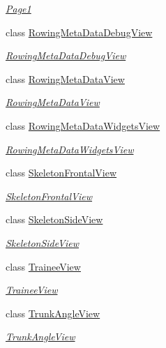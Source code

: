 \begin{DoxyCompactItemize}
\begin{DoxyCompactList}\small\item\em \hyperlink{class_rowing_monitor_1_1_view_1_1_page1}{Page1} \end{DoxyCompactList}\item 
class \hyperlink{class_rowing_monitor_1_1_view_1_1_rowing_meta_data_debug_view}{Rowing\+Meta\+Data\+Debug\+View}
\begin{DoxyCompactList}\small\item\em \hyperlink{class_rowing_monitor_1_1_view_1_1_rowing_meta_data_debug_view}{Rowing\+Meta\+Data\+Debug\+View} \end{DoxyCompactList}\item 
class \hyperlink{class_rowing_monitor_1_1_view_1_1_rowing_meta_data_view}{Rowing\+Meta\+Data\+View}
\begin{DoxyCompactList}\small\item\em \hyperlink{class_rowing_monitor_1_1_view_1_1_rowing_meta_data_view}{Rowing\+Meta\+Data\+View} \end{DoxyCompactList}\item 
class \hyperlink{class_rowing_monitor_1_1_view_1_1_rowing_meta_data_widgets_view}{Rowing\+Meta\+Data\+Widgets\+View}
\begin{DoxyCompactList}\small\item\em \hyperlink{class_rowing_monitor_1_1_view_1_1_rowing_meta_data_widgets_view}{Rowing\+Meta\+Data\+Widgets\+View} \end{DoxyCompactList}\item 
class \hyperlink{class_rowing_monitor_1_1_view_1_1_skeleton_frontal_view}{Skeleton\+Frontal\+View}
\begin{DoxyCompactList}\small\item\em \hyperlink{class_rowing_monitor_1_1_view_1_1_skeleton_frontal_view}{Skeleton\+Frontal\+View} \end{DoxyCompactList}\item 
class \hyperlink{class_rowing_monitor_1_1_view_1_1_skeleton_side_view}{Skeleton\+Side\+View}
\begin{DoxyCompactList}\small\item\em \hyperlink{class_rowing_monitor_1_1_view_1_1_skeleton_side_view}{Skeleton\+Side\+View} \end{DoxyCompactList}\item 
class \hyperlink{class_rowing_monitor_1_1_view_1_1_trainee_view}{Trainee\+View}
\begin{DoxyCompactList}\small\item\em \hyperlink{class_rowing_monitor_1_1_view_1_1_trainee_view}{Trainee\+View} \end{DoxyCompactList}\item 
class \hyperlink{class_rowing_monitor_1_1_view_1_1_trunk_angle_view}{Trunk\+Angle\+View}
\begin{DoxyCompactList}\small\item\em \hyperlink{class_rowing_monitor_1_1_view_1_1_trunk_angle_view}{Trunk\+Angle\+View} \end{DoxyCompactList}\end{DoxyCompactItemize}
